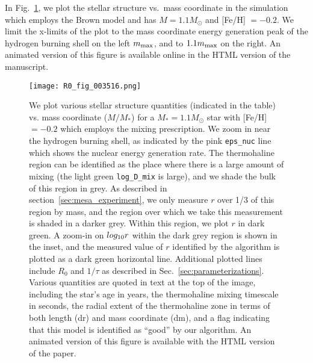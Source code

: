 In Fig.~\ref{Fig:movie}, we plot the stellar structure vs.~mass coordinate in the simulation which employs the Brown model and has $M = 1.1M_\odot$ and [Fe/H] $= -0.2$.
We limit the x-limits of the plot to the mass coordinate energy generation peak of the hydrogen burning shell on the left $m_{\rm max}$, and to $1.1 m_{\rm max}$ on the right.
An animated version of this figure is available online in the HTML version of the manuscript.

\begin{figure}[!tb]
\begin{center}
\texttt{[image: R0\_fig\_003516.png]}
\caption{
    We plot various stellar structure quantities (indicated in the table) vs. mass coordinate ($M / M_*$) for a $M_* = 1.1 M_\odot$ star with [Fe/H] $= -0.2$ which employs the \citet{brown_etal_2013} mixing prescription.
    We zoom in near the hydrogen burning shell, as indicated by the pink \texttt{eps\_nuc} line which shows the nuclear energy generation rate.
    The thermohaline region can be identified as the place where there is a large amount of mixing (the light green \texttt{log\_D\_mix} is large), and we shade the bulk of this region in grey.
    As described in section~\ref{sec:mesa_experiment}, we only measure $r$ over 1/3 of this region by mass, and the region over which we take this measurement is shaded in a darker grey.
    Within this region, we plot $r$ in dark green.
    A zoom-in on $log_{\rm{10}}r$ within the dark grey region is shown in the inset, and the measured value of $r$ identified by the algorithm is plotted as a dark green horizontal line.
    Additional plotted lines include $R_0$ and $1/\tau$ as described in Sec.~\ref{sec:parameterizations}.
    Various quantities are quoted in text at the top of the image, including the star's age in years, the thermohaline mixing timescale in seconds, the radial extent of the thermohaline zone in terms of both length (dr) and mass coordinate (dm), and a flag indicating that this model is identified as ``good'' by our algorithm.
    An animated version of this figure is available with the HTML version of the paper.
    }
\label{Fig:movie}
\end{center}
\end{figure}